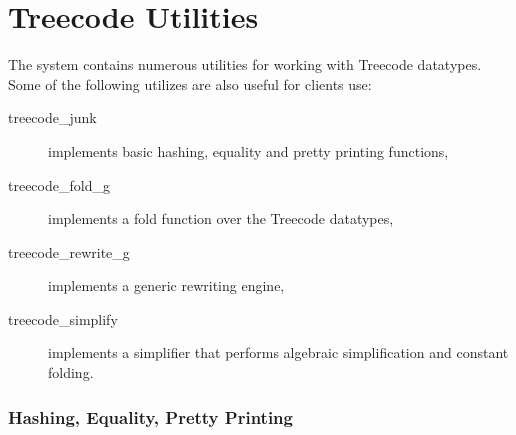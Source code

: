 \section{Treecode Utilities} 

The \LOWHALF{} system contains numerous utilities for working with
Treecode datatypes.  Some of the following utilizes are also useful for clients
use:
\begin{description}
  \item[treecode_junk] implements basic hashing, equality and pretty
printing functions,
  \item[treecode_fold_g] implements a fold function over the Treecode datatypes,  
  \item[treecode_rewrite_g] implements a generic rewriting engine,
  \item[treecode_simplify] implements a simplifier that performs algebraic
simplification and constant folding.
\end{description}
\subsubsection{Hashing, Equality, Pretty Printing}

